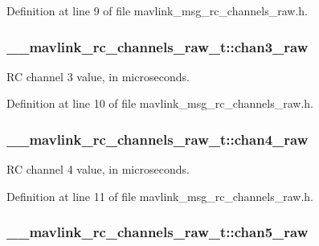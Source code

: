 Definition at line 9 of file mavlink\-\_\-msg\-\_\-rc\-\_\-channels\-\_\-raw.\-h.

\hypertarget{struct____mavlink__rc__channels__raw__t_af56e588a0dcc66fbf2fdb61b5995060c}{
\subsubsection[{chan3\-\_\-raw}]{ \-\_\-\-\_\-mavlink\-\_\-rc\-\_\-channels\-\_\-raw\-\_\-t\-::chan3\-\_\-raw}}\label{struct____mavlink__rc__channels__raw__t_af56e588a0dcc66fbf2fdb61b5995060c}


R\-C channel 3 value, in microseconds. 



Definition at line 10 of file mavlink\-\_\-msg\-\_\-rc\-\_\-channels\-\_\-raw.\-h.

\hypertarget{struct____mavlink__rc__channels__raw__t_a5c7b02424976def78bae64edb08b4c60}{
\subsubsection[{chan4\-\_\-raw}]{ \-\_\-\-\_\-mavlink\-\_\-rc\-\_\-channels\-\_\-raw\-\_\-t\-::chan4\-\_\-raw}}\label{struct____mavlink__rc__channels__raw__t_a5c7b02424976def78bae64edb08b4c60}


R\-C channel 4 value, in microseconds. 



Definition at line 11 of file mavlink\-\_\-msg\-\_\-rc\-\_\-channels\-\_\-raw.\-h.

\hypertarget{struct____mavlink__rc__channels__raw__t_add8ae2761f8b65c92d0d2cc4f2e836fd}{
\subsubsection[{chan5\-\_\-raw}]{ \-\_\-\-\_\-mavlink\-\_\-rc\-\_\-channels\-\_\-raw\-\_\-t\-::chan5\-\_\-raw}}\label{struct____mavlink__rc__channels__raw__t_add8ae2761f8b65c92d0d2cc4f2e836fd}


